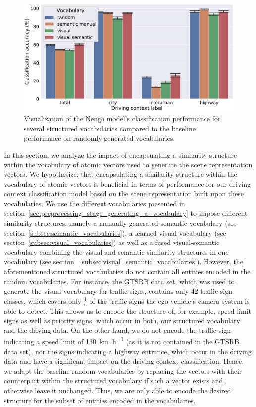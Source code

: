 \begin{figure}[t]
    \centering
    \includegraphics[width=1.\linewidth]{imgs/context_class_vocabularies_tp_and_ts.eps}
    \caption{Visualization of the \ac{Nengo} model's classification performance for several structured vocabularies compared to the baseline performance on randomly generated vocabularies.}
    \label{fig:context_class_vocabularies_tp_and_ts}
\end{figure}

In this section, we analyze the impact of encapsulating a similarity structure within the vocabulary of atomic vectors used to generate the scene representation vectors.
We hypothesize, that encapsulating a similarity structure within the vocabulary of atomic vectors is beneficial in terms of performance for our driving context classification model based on the scene representation built upon these vocabularies.
We use the different vocabularies presented in section~\ref{sec:preprocessing_stage_generating_a_vocabulary} to impose different similarity structures, namely a manually generated semantic vocabulary (see section~\ref{subsec:semantic_vocabularies}), a learned visual vocabulary (see section~\ref{subsec:visual_vocabularies}) as well as a fused visual-semantic vocabulary combining the visual and semantic similarity structures in one vocabulary (see section
~\ref{subsec:visual_semantic_vocabularies}).
However, the aforementioned structured vocabularies do not contain all entities encoded in the random vocabularies.
For instance, the \ac{GTSRB} data set, which was used to generate the visual vocabulary for traffic signs, contains only \num{42} traffic sign classes, which covers only $\frac{1}{6}$ of the traffic signs the ego-vehicle's camera system is able to detect.
This allows us to encode the structure of, for example, speed limit signs as well as priority signs, which occur in both, our structured vocabulary and the driving data.
On the other hand, we do not encode the traffic sign indicating a speed limit of \SI[per-mode=symbol]{130}{\kilo\meter\per\hour} (as it is not contained in the \ac{GTSRB} data set), nor the signs indicating a highway entrance, which occur in the driving data and have a significant impact on the driving context classification.
Hence, we adapt the baseline random vocabularies by replacing the vectors with their counterpart within the structured vocabulary if such a vector exists and otherwise leave it unchanged.
Thus, we are only able to encode the desired structure for the subset of entities encoded in the vocabularies.

